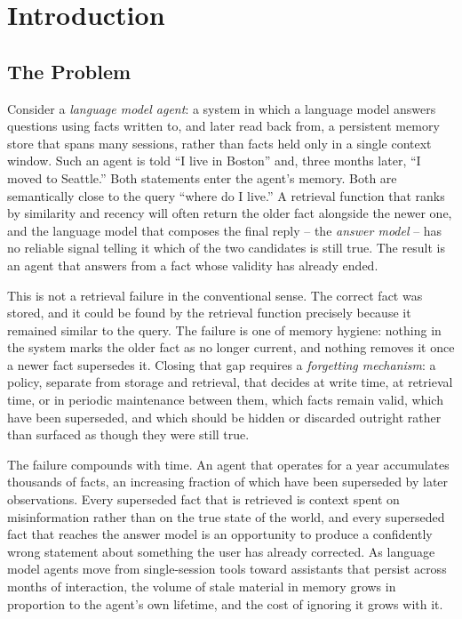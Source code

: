 \chapter{Introduction}
\label{chap:introduction}

\section{The Problem}
\label{sec:the-problem}

Consider a \emph{language model agent}: a system in which a language model answers questions using facts written to, and later read back from, a persistent memory store that spans many sessions, rather than facts held only in a single context window. Such an agent is told ``I live in Boston'' and, three months later, ``I moved to Seattle.'' Both statements enter the agent's memory. Both are semantically close to the query ``where do I live.'' A retrieval function that ranks by similarity and recency will often return the older fact alongside the newer one, and the language model that composes the final reply -- the \emph{answer model} -- has no reliable signal telling it which of the two candidates is still true. The result is an agent that answers from a fact whose validity has already ended.

This is not a retrieval failure in the conventional sense. The correct fact was stored, and it could be found by the retrieval function precisely because it remained similar to the query. The failure is one of memory hygiene: nothing in the system marks the older fact as no longer current, and nothing removes it once a newer fact supersedes it. Closing that gap requires a \emph{forgetting mechanism}: a policy, separate from storage and retrieval, that decides at write time, at retrieval time, or in periodic maintenance between them, which facts remain valid, which have been superseded, and which should be hidden or discarded outright rather than surfaced as though they were still true.

The failure compounds with time. An agent that operates for a year accumulates thousands of facts, an increasing fraction of which have been superseded by later observations. Every superseded fact that is retrieved is context spent on misinformation rather than on the true state of the world, and every superseded fact that reaches the answer model is an opportunity to produce a confidently wrong statement about something the user has already corrected. As language model agents move from single-session tools toward assistants that persist across months of interaction, the volume of stale material in memory grows in proportion to the agent's own lifetime, and the cost of ignoring it grows with it.

